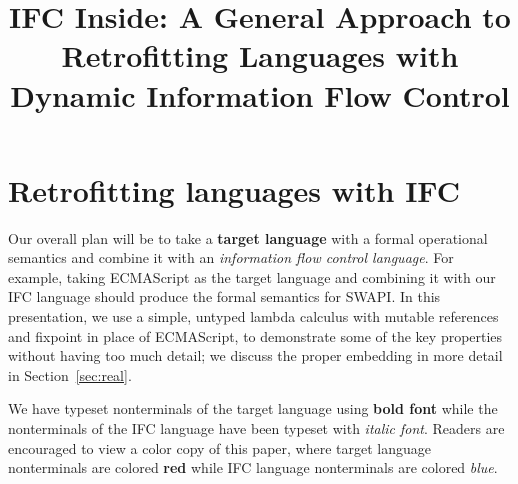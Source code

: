 \documentclass{sigplanconf}
\begin{document}







\title{
IFC Inside: A General Approach to Retrofitting Languages with Dynamic Information Flow Control
}


\maketitle



\section{Retrofitting languages with IFC}
\label{sec:retrofit}

Our overall plan will be to take a \textbf{{\color{red} target
language}} with a formal operational semantics and combine it with an
\textit{{\color{blue} information flow control language}}.  For example,
taking ECMAScript as the target language and combining it with our IFC
language should produce the formal semantics for SWAPI.  In this
presentation, we use a simple, untyped lambda calculus with mutable
references and fixpoint in place of ECMAScript, to demonstrate some of the key
properties without having too much detail; we discuss the proper
embedding in more detail in Section~\ref{sec:real}.

We have typeset nonterminals of the target language using \textbf{{\color{red}
bold font}} while the nonterminals of the IFC language have been typeset
with \textit{{\color{blue} italic font}}.  Readers are encouraged to view
a color copy of this paper, where target language nonterminals are colored \textbf{{\color{red} red}}
while IFC language nonterminals are colored \textit{{\color{blue} blue}}.
\end{document}
